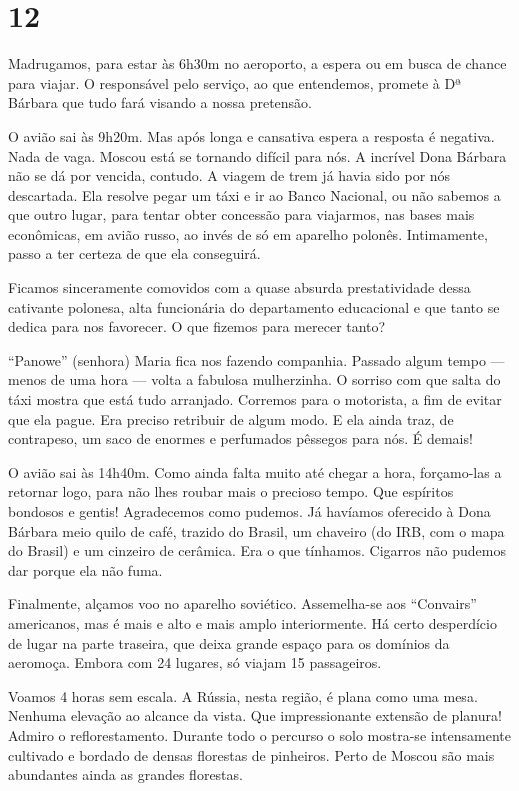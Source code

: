\section*{12 \adfflatleafright {}}
Madrugamos, para estar às 6h30m no aeroporto, a espera ou em busca de chance para viajar. O responsável pelo serviço, ao que entendemos, promete à Dª Bárbara que tudo fará visando a nossa pretensão.

O avião sai às 9h20m. Mas após longa e cansativa espera a resposta é negativa. Nada de vaga. Moscou está se tornando difícil para nós. A incrível Dona Bárbara não se dá por vencida, contudo. A viagem de trem já havia sido por nós descartada. Ela resolve pegar um táxi e ir ao Banco Nacional, ou não sabemos a que outro lugar, para tentar obter concessão para viajarmos, nas bases mais econômicas, em avião russo, ao invés de só em aparelho polonês. Intimamente, passo a ter certeza de que ela conseguirá.

Ficamos sinceramente comovidos com a quase absurda prestatividade dessa cativante polonesa, alta funcionária do departamento educacional e que tanto se dedica para nos favorecer. O que fizemos para merecer tanto?

``Panowe'' (senhora) Maria fica nos fazendo companhia. Passado algum tempo --- menos de uma hora --- volta a fabulosa mulherzinha. O sorriso com que salta do táxi mostra que está tudo arranjado. Corremos para o motorista, a fim de evitar que ela pague. Era preciso retribuir de algum modo. E ela ainda traz, de contrapeso, um saco de enormes e perfumados pêssegos para nós. É demais!

O avião sai às 14h40m. Como ainda falta muito até chegar a hora, forçamo-las a retornar logo, para não lhes roubar mais o precioso tempo. Que espíritos bondosos e gentis! Agradecemos como pudemos. Já havíamos oferecido à Dona Bárbara meio quilo de café, trazido do Brasil, um chaveiro (do IRB, com o mapa do Brasil) e um cinzeiro de cerâmica. Era o que tínhamos. Cigarros não pudemos dar porque ela não fuma.

Finalmente, alçamos voo no aparelho soviético. Assemelha-se aos ``Convairs'' americanos, mas é mais e alto e mais amplo interiormente. Há certo desperdício de lugar na parte traseira, que deixa grande espaço para os domínios da aeromoça. Embora com 24 lugares, só viajam 15 passageiros.

Voamos 4 horas sem escala. A Rússia, nesta região, é plana como uma mesa. Nenhuma elevação ao alcance da vista. Que impressionante extensão de planura! Admiro o reflorestamento. Durante todo o percurso o solo mostra-se intensamente cultivado e bordado de densas florestas de pinheiros. Perto de Moscou são mais abundantes ainda as grandes florestas.

